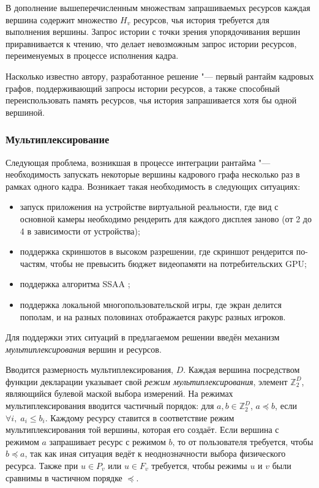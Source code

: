 В дополнение вышеперечисленным множествам запрашиваемых ресурсов каждая вершина содержит множество $H_v$ ресурсов, чья история требуется для выполнения вершины.
Запрос истории с точки зрения упорядочивания вершин приравнивается к чтению, что делает невозможным запрос истории ресурсов, переименуемых в процессе исполнения кадра.

Насколько известно автору, разработанное решение "--- первый рантайм кадровых графов, поддерживающий запросы истории ресурсов, а также способный переиспользовать память ресурсов, чья история запрашивается хотя бы одной вершиной.

\subsubsection{Мультиплексирование}
Следующая проблема, возникшая в процессе интеграции рантайма "--- необходимость запускать некоторые вершины кадрового графа несколько раз в рамках одного кадра.
Возникает такая необходимость в следующих ситуациях:
\begin{itemize}
    \item запуск приложения на устройстве виртуальной реальности, где вид с основной камеры необходимо рендерить для каждого дисплея заново (от 2 до 4 в зависимости от устройства);
    \item поддержка скриншотов в высоком разрешении, где скриншот рендерится по-частям, чтобы не превысить бюджет видеопамяти на потребительских GPU;
    \item поддержка алгоритма SSAA ;
    \item поддержка локальной многопользовательской игры, где экран делится пополам, и на разных половинах отображается ракурс разных игроков.
\end{itemize}
Для поддержки этих ситуаций в предлагаемом решении введён механизм \textit{мультиплексирования} вершин и ресурсов.

Вводится размерность мультиплексирования, $D$.
Каждая вершина посредством функции декларации указывает свой \textit{режим мультиплексирования}, элемент $\mathbb{Z}_2^D$, являющийся булевой маской выбора измерений.
На режимах мультиплексирования вводится частичный порядок: для $a,b\in\mathbb{Z}_2^D$, $a \preceq b$, если $\forall i,\;a_i \leqslant b_i$.
Каждому ресурсу ставится в соответствие режим мультиплексирования той вершины, которая его создаёт.
Если вершина с режимом $a$ запрашивает ресурс с режимом $b$, то от пользователя требуется, чтобы $b \preceq a$, так как иная ситуация ведёт к неоднозначности выбора физического ресурса.
Также при $u \in P_v$ или $u \in F_v$ требуется, чтобы режимы $u$ и $v$ были сравнимы в частичном порядке $\preceq$.

